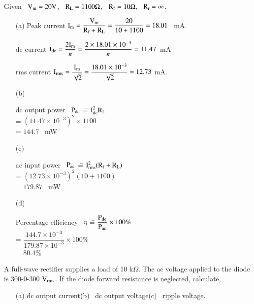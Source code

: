 \begin{solution}
Given \ $\textrm{V}_{\textrm{m}}=20\textrm{V}$, \ $\textrm{R}_{\textrm{L}}=1100\Omega$, \ $\textrm{R}_{\textrm{f}}=10\Omega$, \ $\textrm{R}_{\textrm{r}}=\infty$.
\begin{itemize}
\item[(a)] Peak current $\textrm{I}_{\textrm{m}}=\dfrac{\textrm{V}_{\textrm{m}}}{\textrm{R}_{\textrm{f}}+\textrm{R}_{\textrm{L}}}=\dfrac{20}{10+1100}=18.01$~ mA.

\smallskip
\quad dc current $\textrm{I}_{\text{dc}}=\dfrac{2\textrm{I}_{\textrm{m}}}{\pi}=\dfrac{2\times 18.01\times 10^{-3}}{\pi}=11.47$~mA

\smallskip
rms current $\textrm{I}_{\text{rms}}=\dfrac{\textrm{I}_{\textrm{m}}}{\sqrt{2}}=\dfrac{18.01\times 10^{-3}}{\sqrt{2}}=12.73$ mA.

\smallskip
\item[(b)]
\begin{tabbing}
dc output power \ $\textrm{P}_{\text{dc}}$ \== $\textrm{I}^{2}_{\text{dc}}\textrm{R}_{\textrm{L}}$\\[4pt]
                                  \>= $(11.47\times 10^{-3})^{2}\times 1100$\\[4pt]
                                  \>= $144.7$~ mW
\end{tabbing}

\item[(c)]
\begin{tabbing}
ac input power \ $\textrm{P}_{\text{ac}}$ \== $\textrm{I}^{2}_{\text{rms}}(\textrm{R}_{\textrm{f}}+\textrm{R}_{\textrm{L}})$\\[4pt]
                                 \>= $(12.73\times 10^{-3})^{2}(10+1100)$\\[4pt]
                                 \>= $179.87$~ mW
\end{tabbing}

\item[(d)] 
\begin{tabbing}
Percentage efficiency \ $\eta$ \== $\dfrac{\textrm{P}_{\text{dc}}}{\textrm{P}_{\text{ac}}}\times 100\%$\\[4pt]
                               \>= $\dfrac{144.7\times 10^{-3}}{179.87\times 10^{-3}}\times 100\%$\\[4pt]
                               \>= $80.4\%$
\end{tabbing}
\end{itemize}
\end{solution}

\begin{problem}\label{prob1.10}
A full-wave rectifier supplies a load of 10 k$\Omega$. The ac voltage applied to the diode is 300-0-300 $\textrm{V}_{\text{rms}}$. If the diode forward resistance is neglected, calculate,
\begin{itemize}
\item[(a)] dc output current\qquad (b)~ dc output voltage\qquad (c)~ ripple voltage.
\end{itemize}
\end{problem}

